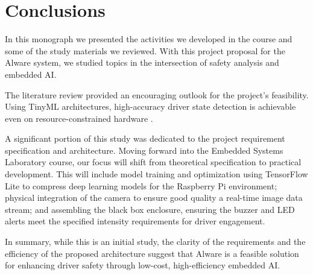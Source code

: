 \chapter{Conclusions} \label{cap:consideracoes}

In this monograph we presented the activities we developed in the course and some of the study materials we reviewed. With this project proposal for the Alware system, we studied topics in the intersection of safety analysis and embedded AI.

The literature review provided an encouraging outlook for the project's feasibility. Using TinyML architectures, high-accuracy driver state detection is achievable even on resource-constrained hardware \cite{essa2026} \cite{lumina2026}.

A significant portion of this study was dedicated to the project requirement specification and architecture. Moving forward into the Embedded Systems Laboratory course, our focus will shift from theoretical specification to practical development. This will include model training and optimization using TensorFlow Lite to compress deep learning models for the Raspberry Pi environment; physical integration of the camera to ensure good quality a real-time image data stream; and assembling the black box enclosure, ensuring the buzzer and LED alerts meet the specified intensity requirements for driver engagement.

In summary, while this is an initial study, the clarity of the requirements and the efficiency of the proposed architecture suggest that Alware is a feasible solution for enhancing driver safety through low-cost, high-efficiency embedded AI.